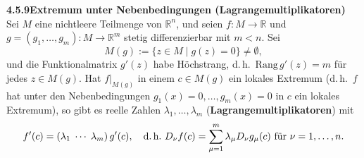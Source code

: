 \documentclass[a4paper,12pt]{article}
\newcommand{\gentry}[3]{%
  \noindent\textbf{#1\quad #2}\nopagebreak\\[0.2em]
  #3\par\smallskip
}
\begin{document}
\gentry{4.5.9}{Extremum unter Nebenbedingungen (Lagrangemultiplikatoren)}{%
  Sei $M$ eine nichtleere Teilmenge von $\mathbb{R}^n$, und seien $f: M \to \mathbb{R}$ und
  $g = (g_1, \ldots, g_m): M \to \mathbb{R}^m$ stetig differenzierbar mit $m < n$. Sei
  \[
    M(g) := \{ z \in M \mid g(z) = 0 \} \neq \emptyset,
  \]
  und die Funktionalmatrix $g'(z)$ habe Höchstrang, d.\,h.\ $\mathrm{Rang}\,g'(z) = m$ für jedes
  $z \in M(g)$. Hat $f|_{M(g)}$ in einem $c \in M(g)$ ein lokales Extremum (d.\,h.\ $f$ hat unter
  den Nebenbedingungen $g_1(x) = 0, \ldots, g_m(x) = 0$ in $c$ ein lokales Extremum), so gibt
  es reelle Zahlen $\lambda_1, \ldots, \lambda_m$ (\textbf{Lagrangemultiplikatoren}) mit
  \[
    f'(c) = (\lambda_1 \; \cdots \; \lambda_m)\,g'(c),
    \quad \text{d.\,h.\ } D_\nu f(c) = \sum_{\mu=1}^{m} \lambda_\mu D_\nu g_\mu(c) \text{ für } \nu = 1, \ldots, n.
  \]
}
\end{document}
